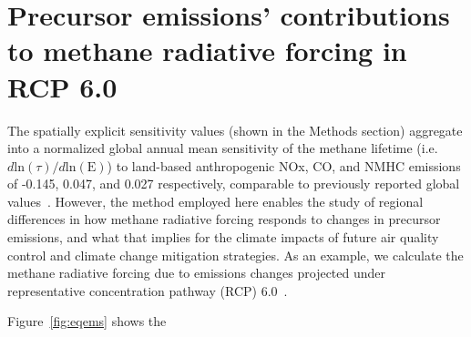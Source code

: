 \section{Precursor emissions' contributions to methane radiative forcing in RCP 6.0}

The spatially explicit sensitivity values (shown in the Methods section) aggregate into a normalized global annual mean sensitivity of the methane lifetime (i.e. $d \mathrm{ln}(\tau)/d\mathrm{ln}(\mathrm{E})$) to land-based anthropogenic NOx, CO, and NMHC emissions of -0.145, 0.047, and 0.027 respectively, comparable to previously reported global values~\citep{ref:fry2012,ref:holmes2013}. However, the method employed here enables the study of regional differences in how methane radiative forcing responds to changes in precursor emissions, and what that implies for the climate impacts of future air quality control and climate change mitigation strategies. As an example, we calculate the methane radiative forcing due to emissions changes projected under representative concentration pathway (RCP) 6.0~\citep{ref:vanvuuren2011}.

Figure~\ref{fig:eqems} shows the


